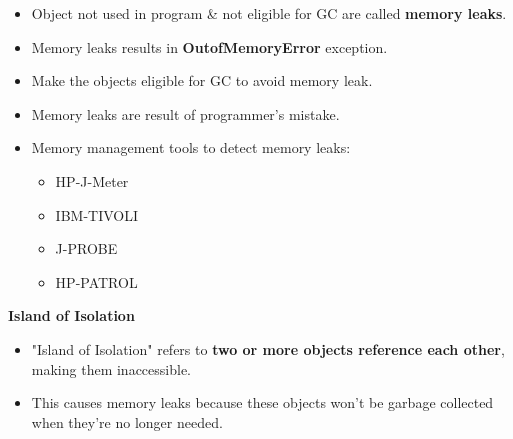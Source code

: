 \setlength{\columnsep}{3pt}
\begin{flushleft}
	
	\begin{itemize}
		\item Object not used in program \& not eligible for GC are called \textbf{memory leaks}.
		\item Memory leaks results in \textbf{OutofMemoryError} exception.
		\item Make the objects eligible for GC to avoid memory leak.
		\item Memory leaks are result of programmer's mistake.
		\item Memory management tools to detect memory leaks:
		\begin{itemize}
			\item HP-J-Meter
			\item IBM-TIVOLI
			\item J-PROBE
			\item HP-PATROL
		\end{itemize}
	\end{itemize}

	\textbf{Island of Isolation}
	\begin{itemize}
		\item "Island of Isolation" refers to \textbf{two or more objects reference each other}, making them inaccessible.
		\item This causes memory leaks because these objects won't be garbage collected when they're no longer needed.
	\end{itemize}			
	
\end{flushleft}

